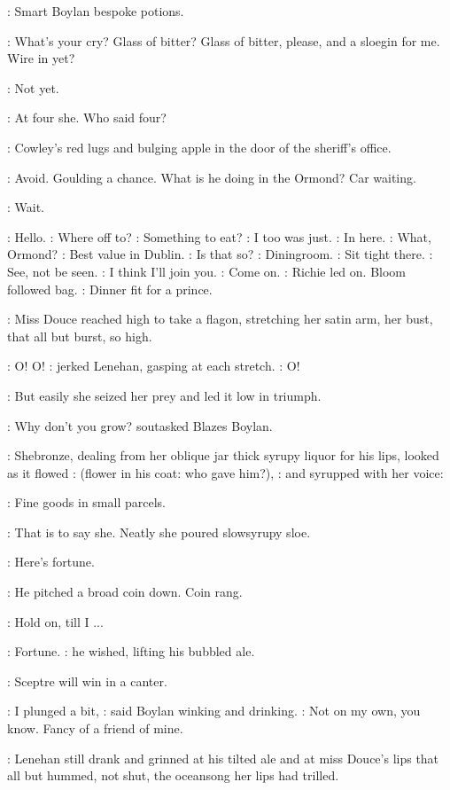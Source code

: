:
Smart Boylan bespoke potions.

\boylan:
What's your cry?
Glass of bitter? Glass of bitter, please,
and a sloegin for me. Wire in yet?

\MissD:
Not yet.

\BloomInt:
At four she. Who said four?

:
Cowley's red lugs and bulging apple in the door of the
sheriff's office.

\BloomInt:
Avoid. Goulding a chance. What is he doing in the Ormond?
Car waiting.

\BloomInt:
Wait.

\BloomInt:
Hello.
\Goulding:
Where off to?
\BloomInt:
Something to eat?
\Goulding:
I too was just.
\BloomInt:
In here.
\Goulding:
What, Ormond?
\BloomInt:
Best value in Dublin.
\Goulding:
Is that so?
\BloomInt:
Diningroom.
\BloomInt:
Sit tight there.
\BloomInt:
See, not be seen.
\Goulding:
I think I'll join you.
\Goulding:
Come on.
:
Richie led on.
Bloom followed bag.
\BloomInt:
Dinner fit for a prince.

:
Miss Douce reached high to take a flagon,
stretching her satin arm,
her bust, that all but burst, so high.

\Lenehan:
O! O!
:
jerked Lenehan, gasping at each stretch.
\Lenehan:
O!

:
But easily she seized her prey and led it low in triumph.

\boylan:
Why don't you grow?
sout{asked Blazes Boylan.}

:
Shebronze, dealing from her oblique jar thick syrupy liquor for his
lips, looked as it flowed
\BloomInt:
(flower in his coat: who gave him?),
:
and syrupped with her voice:

\MissD:
Fine goods in small parcels.

:
That is to say she. Neatly she poured slowsyrupy sloe.

\boylan:
Here's fortune.

:
He pitched a broad coin down. Coin rang.

\Lenehan:
Hold on, till I ...

\Lenehan:
Fortune.
:
he wished, lifting his bubbled ale.

\Lenehan:
Sceptre will win in a canter.

\boylan:
I plunged a bit,
:
said Boylan winking and drinking.
\boylan:
Not on my own, you know. Fancy of a friend of mine.

:
Lenehan still drank and grinned at his tilted ale and at
miss Douce's lips that all but hummed, not shut,
the oceansong her lips had trilled.

